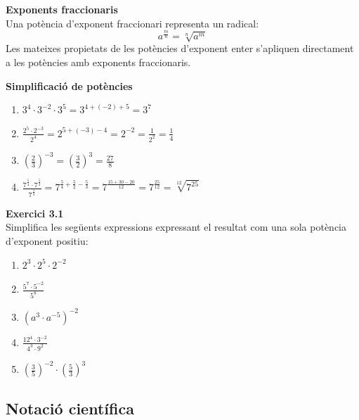 \documentclass[12pt]{article}
\begin{document}
\begin{concept}
\textbf{Exponents fraccionaris}\\
Una potència d'exponent fraccionari representa un radical:
\[ a^{\frac{m}{n}} = \sqrt[n]{a^m} \]
Les mateixes propietats de les potències d'exponent enter s'apliquen directament a les potències amb exponents fraccionaris.
\end{concept}

\begin{exemple}
\textbf{Simplificació de potències}
\begin{enumerate}[label=\alph*)]
    \item $3^4 \cdot 3^{-2} \cdot 3^5 = 3^{4 + (-2) + 5} = 3^7$
    \item $\frac{2^5 \cdot 2^{-3}}{2^4} = 2^{5 + (-3) - 4} = 2^{-2} = \frac{1}{2^2} = \frac{1}{4}$
    \item $\left(\frac{2}{3}\right)^{-3} = \left(\frac{3}{2}\right)^3 = \frac{27}{8}$
    \item $\frac{7^{\frac{5}{4}} \cdot 7^{\frac{5}{2}}}{7^{\frac{5}{3}}} = 7^{\frac{5}{4} + \frac{5}{2} - \frac{5}{3}} = 7^{\frac{15 + 30 - 20}{12}} = 7^{\frac{25}{12}} = \sqrt[12]{7^{25}}$
\end{enumerate}
\end{exemple}

\begin{exercici}
\textbf{Exercici 3.1}\\
Simplifica les següents expressions expressant el resultat com una sola potència d'exponent positiu:
\begin{enumerate}[label=\alph*)]
    \item $2^3 \cdot 2^5 \cdot 2^{-2}$
    \item $\frac{5^7 \cdot 5^{-2}}{5^8}$
    \item $\left(a^3 \cdot a^{-5}\right)^{-2}$
    \item $\frac{12^4 \cdot 3^{-2}}{4^3 \cdot 9^2}$
    \item $\left(\frac{3}{5}\right)^{-2} \cdot \left(\frac{5}{3}\right)^3$
\end{enumerate}
\end{exercici}

\subsection{Notació científica}
\end{document}
